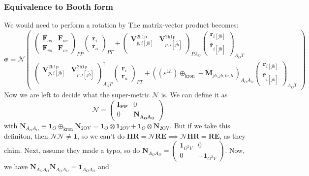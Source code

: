 \subsubsection{Equivalence to Booth form}
We would need to perform a rotation by
The matrix-vector product becomes:
\[
\bm{\sigma}
= 
\bm{\mathcal{N}}
\begin{pmatrix}
 \begin{pmatrix}
\bm{F}_{oo} & \bm{F}_{ov} \\ \bm{F}_{vo} & \bm{F}_{vv}
\end{pmatrix}_{PP} \begin{pmatrix}
\bm{r}_i \\ \bm{r}_a
\end{pmatrix}_{PT} + \begin{pmatrix}
    \bm{V}^{2 \mathrm{h1p}}_{p,i[jb]} & \bm{V}^{2 \mathrm{h1p}}_{p,i[\bar{jb}]} \\
\end{pmatrix}_{PA_O} \begin{pmatrix}
    \bm{r}_{i[jb]} \\
\bm{\bar{r}}_{i[\bar{jb}]}
\end{pmatrix}_{A_OT} \\[6pt]
 \begin{pmatrix}
    \bm{V}^{2 \mathrm{h1p}}_{p,i[jb]} & \bm{V}^{2 \mathrm{h1p}}_{p,i[\bar{jb}]} \\
\end{pmatrix}^\dag_{A_OP} \begin{pmatrix}
\bm{r}_i \\ \bm{r}_a
\end{pmatrix}_{PT} +
\left(\left(\varepsilon^{1h}\right) \oplus_{\text{kron}} -\bm{\tilde{M}}_{jb,jb;lc,lc}\right)_{A_OA_O} \begin{pmatrix}
    \bm{r}_{i[jb]} \\
\bm{\bar{r}}_{i[\bar{jb}]}
\end{pmatrix}_{A_OT}
\end{pmatrix}
\]
Now we are left to decide what the super-metric $\bm{\mathcal{N}}$ is. We can define it as
\[\bm{\mathcal{N}} =
\begin{pmatrix}
\bm{I_{PP}} & 0 \\[3pt]
0 & \bm{N_{A_OA_O}}
\end{pmatrix}
\]
 with $\bm{N}_{A_OA_O} \equiv \bm{1}_{O} \oplus_{\text{kron}} \bm{N}_{\text{2OV}}=\bm{1}_O \otimes \bm{1}_{2OV} + \bm{1}_{O} \otimes \bm{N}_{\text{2OV}}$. But if we take this definiton, then $\bm{\mathcal{N}}\bm{\mathcal{N}} \neq \bm{1}$, so we can't do $\bm{H} \bm{R} = \bm{\mathcal{N}} \bm{R} \bm{E} \implies \bm{\mathcal{N}} \bm{H} \bm{R} = \bm{R} \bm{E}$, as they claim. Next, assume they made a typo, so do $\bm{N}_{A_OA_O} = \begin{pmatrix}
 \bm{1}_{O^2V} & 0 \\
0 & \bm{-1}_{O^2V}
 \end{pmatrix}$. Now, we have  $\bm{N}_{A_OA_O}\bm{N}_{A_OA_O} = \bm{1}_{A_OA_O}$ and

